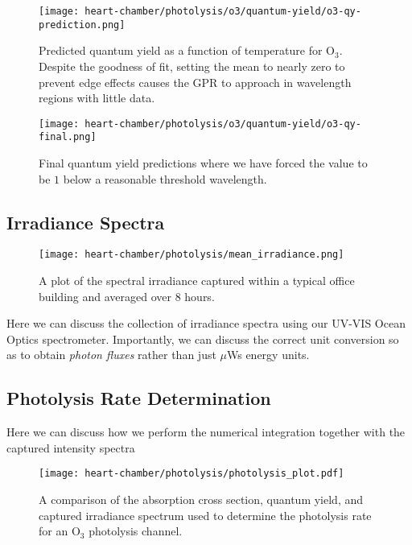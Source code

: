 \begin{figure}[h]
  \centering
  \texttt{[image: heart-chamber/photolysis/o3/quantum-yield/o3-qy-prediction.png]}
  \caption{Predicted quantum yield as a function of temperature for $\mathrm{O_3}$. Despite the goodness of fit, setting the mean to nearly zero to prevent edge effects causes the GPR to approach in wavelength regions with little data.}
  \label{fig:qy-o3-pred}
\end{figure}


\begin{figure}[h]
  \centering
  \texttt{[image: heart-chamber/photolysis/o3/quantum-yield/o3-qy-final.png]}
  \caption{Final quantum yield predictions where we have forced the value to be $1$ below a reasonable threshold wavelength.}
  \label{fig:qy-o3-final}
\end{figure}


\subsection{Irradiance Spectra}

\begin{figure}[h]
  \centering
  \texttt{[image: heart-chamber/photolysis/mean\_irradiance.png]}
  \caption{A plot of the spectral irradiance captured within a typical office building and averaged over 8 hours.}
  \label{fig:mean-irradiance}
\end{figure}


Here we can discuss the collection of irradiance spectra using our UV-VIS Ocean Optics spectrometer. Importantly, we can discuss the correct unit conversion so as to obtain \textit{photon fluxes} rather than just $\mu$Ws energy units.

\subsection{Photolysis Rate Determination}

Here we can discuss how we perform the numerical integration together with the captured intensity spectra

\begin{figure}
  \centering
  \texttt{[image: heart-chamber/photolysis/photolysis\_plot.pdf]}
  \caption{A comparison of the absorption cross section, quantum yield, and captured irradiance spectrum used to determine the photolysis rate for an $\mathrm{O_3}$ photolysis channel.}
  \label{fig:phot-rate-example}
\end{figure}

